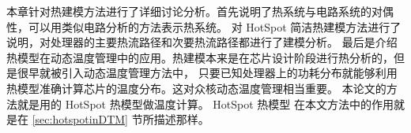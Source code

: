 本章针对热建模方法进行了详细讨论分析。首先说明了热系统与电路系统的对偶性，可以用类似电路分析的方法表示热系统。
对 HotSpot 简洁热建模方法进行了说明，对处理器的主要热流路径和次要热流路径都进行了建模分析。
最后是介绍热模型在动态温度管理中的应用。热建模本来是在芯片设计阶段进行热分析的，但是很早就被引入动态温度管理方法中，
只要已知处理器上的功耗分布就能够利用热模型准确计算芯片的温度分布。这对众核动态温度管理相当重要。
本论文的方法就是用的 HotSpot 热模型做温度计算。
 HotSpot 热模型 在本文方法中的作用就是在 \ref{sec:hotspotinDTM} 节所描述那样。




















